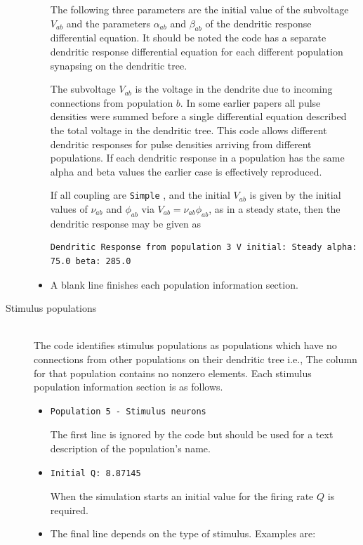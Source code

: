 \documentclass[12pt,a4paper]{article}
\newcommand{\type}[1]{ {\small\small\tt #1} }
\begin{document}
\begin{description}
\begin{itemize}
	The following three parameters are the initial value of the subvoltage $V_{ab}$ and the parameters $\alpha_{ab}$ and $\beta_{ab}$ of the dendritic response differential equation. It should be noted the code has a separate dendritic response differential equation for each different population synapsing on the dendritic tree.
	
	The subvoltage $V_{ab}$ is the voltage in the dendrite due to incoming connections from population $b$. In some earlier papers all pulse densities were summed before a single differential equation described the total voltage in the dendritic tree. This code allows different dendritic responses for pulse densities arriving from different populations. If each dendritic response in a population has the same alpha and beta values the earlier case is effectively reproduced.
	
	If all coupling are \type{Simple}, and the initial $V_{ab}$ is given by the initial values of $\nu_{ab}$ and $\phi_{ab}$ via $V_{ab}= \nu_{ab} \phi_{ab}$, as in a steady state, then the dendritic response may be given as
	\begin{lstlisting}
Dendritic Response from population 3 V initial: Steady alpha: 75.0 beta: 285.0
	\end{lstlisting}
	\item A blank line finishes each population information section.
	\end{itemize}

\item[Stimulus populations]\ \\

The code identifies stimulus populations as populations which have no connections from other populations on their dendritic tree i.e., The column for that population contains no nonzero elements.  Each stimulus population information section is as follows.
\begin{itemize}
	\item \begin{lstlisting}
Population 5 - Stimulus neurons
	\end{lstlisting}
	The first line is ignored by the code but should be used for a text description of the population's name.
	\item
	\begin{lstlisting}
Initial Q: 8.87145
	\end{lstlisting}
	When the simulation starts an initial value for the firing rate $Q$ is required.
	\item The final line depends on the type of stimulus. Examples are:\\


\end{itemize}
\end{description}
\end{document}
